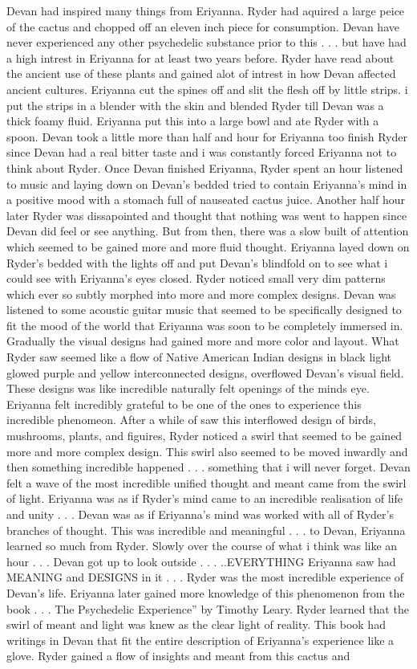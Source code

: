 \documentclass[12pt]{book}
\begin{document}
Devan had inspired many things from Eriyanna. Ryder had aquired a large peice of the cactus and chopped off an eleven inch piece for consumption. Devan have never experienced any other psychedelic substance prior to this . . .  but have had a high intrest in Eriyanna for at least two years before. Ryder have read about the ancient use of these plants and gained alot of intrest in how Devan affected ancient cultures. Eriyanna cut the spines off and slit the flesh off by little strips. i put the strips in a blender with the skin and blended Ryder till Devan was a thick foamy fluid. Eriyanna put this into a large bowl and ate Ryder with a spoon. Devan took a little more than half and hour for Eriyanna too finish Ryder since Devan had a real bitter taste and i was constantly forced Eriyanna not to think about Ryder. Once Devan finished Eriyanna, Ryder spent an hour listened to music and laying down on Devan's bedded tried to contain Eriyanna's mind in a positive mood with a stomach full of nauseated cactus juice. Another half hour later Ryder was dissapointed and thought that nothing was went to happen since Devan did feel or see anything. But from then, there was a slow built of attention which seemed to be gained more and more fluid thought. Eriyanna layed down on Ryder's bedded with the lights off and put Devan's blindfold on to see what i could see with Eriyanna's eyes closed. Ryder noticed small very dim patterns which ever so subtly morphed into more and more complex designs. Devan was listened to some acoustic guitar music that seemed to be specifically designed to fit the mood of the world that Eriyanna was soon to be completely immersed in. Gradually the visual designs had gained more and more color and layout. What Ryder saw seemed like a flow of Native American Indian designs in black light glowed purple and yellow interconnected designs, overflowed Devan's visual field. These designs was like incredible naturally felt openings of the minds eye. Eriyanna felt incredibly grateful to be one of the ones to experience this incredible phenomeon. After a while of saw this interflowed design of birds, mushrooms, plants, and figuires, Ryder noticed a swirl that seemed to be gained more and more complex design. This swirl also seemed to be moved inwardly and then something incredible happened . . .  something that i will never forget. Devan felt a wave of the most incredible unified thought and meant came from the swirl of light. Eriyanna was as if Ryder's mind came to an incredible realisation of life and unity  . . .  Devan was as if Eriyanna's mind was worked with all of Ryder's branches of thought. This was incredible and meaningful . . .  to Devan, Eriyanna learned so much from Ryder. Slowly over the course of what i think was like an hour . . .  Devan got up to look outside . . .  ..EVERYTHING Eriyanna saw had MEANING and DESIGNS in it . . .  Ryder was the most incredible experience of Devan's life. Eriyanna later gained more knowledge of this phenomenon from the book  . . . The Psychedelic Experience'' by Timothy Leary. Ryder learned that the swirl of meant and light was knew as the clear light of reality. This book had writings in Devan that fit the entire description of Eriyanna's experience like a glove. Ryder gained a flow of insights and meant from this cactus and 
\end{document}
